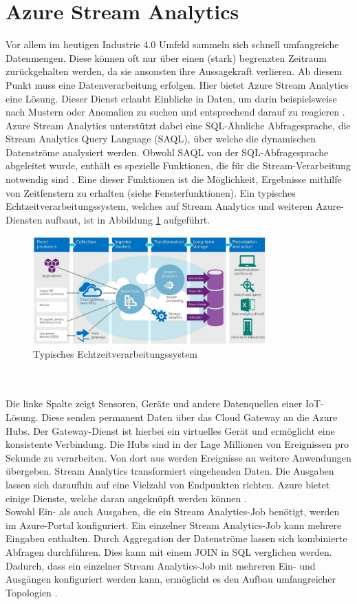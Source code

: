 \section{Azure Stream Analytics}
Vor allem im heutigen Industrie 4.0 Umfeld sammeln sich schnell umfangreiche Datenmengen. Diese können oft nur über einen (stark) begrenzten Zeitraum zurückgehalten werden, da sie ansonsten ihre Aussagekraft verlieren. Ab diesem Punkt muss eine Datenverarbeitung erfolgen. Hier bietet Azure Stream Analytics eine Lösung. Dieser Dienst erlaubt Einblicke in Daten, um darin beispielsweise nach Mustern oder Anomalien zu suchen und entsprechend darauf zu reagieren \cite{Klein.2017}. Azure Stream Analytics unterstützt dabei eine SQL-Ähnliche Abfragesprache, die Stream Analytics Query Language (SAQL), über welche die dynamischen Datenströme analysiert werden. Obwohl SAQL von der SQL-Abfragesprache abgeleitet wurde, enthält es spezielle Funktionen, die für die Stream-Verarbeitung notwendig sind \cite{Prosise.}. Eine dieser Funktionen ist die Möglichkeit, Ergebnisse mithilfe von Zeitfenstern zu erhalten (siehe Fensterfunktionen). Ein typisches Echtzeitverarbeitungssystem, welches auf Stream Analytics und weiteren Azure-Diensten aufbaut, ist in Abbildung \ref{uebersicht} aufgeführt.
\begin{figure}[ht]
	\centering
	\includegraphics[width=0.8\textwidth,]{images/StreamAnalytics}
	\caption{Typisches Echtzeitverarbeitungssystem \cite{Prosise.}}
	\label{uebersicht}
\end{figure}
\\ \\Die linke Spalte zeigt Sensoren, Geräte und andere Datenquellen einer IoT-Lösung. Diese senden permanent Daten über das Cloud Gateway an die Azure Hubs. Der Gateway-Dienst ist hierbei ein virtuelles Gerät und ermöglicht eine konsistente Verbindung. Die Hubs sind in der Lage Millionen von Ereignissen pro Sekunde zu verarbeiten. Von dort aus werden Ereignisse an weitere Anwendungen übergeben. Stream Analytics transformiert eingehenden Daten. Die Ausgaben lassen sich daraufhin auf eine Vielzahl von Endpunkten richten. Azure bietet einige Dienste, welche daran angeknüpft werden können \cite{Prosise.}. \\
Sowohl Ein- als auch Ausgaben, die ein Stream Analytics-Job benötigt, werden im Azure-Portal konfiguriert. Ein einzelner Stream Analytics-Job kann mehrere Eingaben enthalten. Durch Aggregation der Datenströme lassen sich kombinierte Abfragen durchführen. Dies kann mit einem JOIN in SQL verglichen werden. Dadurch, dass ein einzelner Stream Analytics-Job mit mehreren Ein- und Ausgängen konfiguriert werden kann, ermöglicht es den Aufbau umfangreicher Topologien \cite{Prosise.}.

